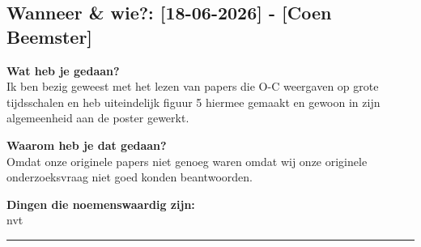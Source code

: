 
\subsection*{Wanneer \& wie?: [18-06-2026] - [Coen Beemster]}

\textbf{Wat heb je gedaan?}\\
Ik ben bezig geweest met het lezen van papers die O-C weergaven op grote tijdsschalen en heb uiteindelijk figuur 5 hiermee gemaakt en gewoon in zijn algemeenheid aan de poster gewerkt.
\vspace{0.3cm} 

\noindent \textbf{Waarom heb je dat gedaan?}\\
Omdat onze originele papers niet genoeg waren omdat wij onze originele onderzoeksvraag niet goed konden beantwoorden.

\noindent \textbf{Dingen die noemenswaardig zijn:}\\
nvt


\vspace{0.5cm}
\hrule 
\vspace{0.5cm}